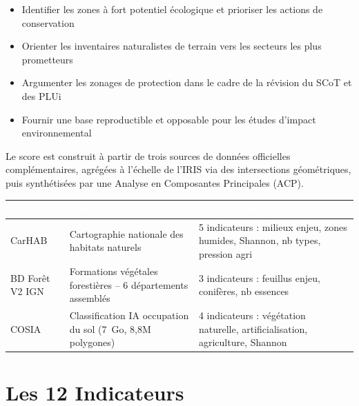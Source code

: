 \documentclass[12pt,a4paper]{report}
\begin{document}
\begin{itemize}[leftmargin=1.5cm]
  \item Identifier les zones à fort potentiel écologique et prioriser les actions de conservation
  \item Orienter les inventaires naturalistes de terrain vers les secteurs les plus prometteurs
  \item Argumenter les zonages de protection dans le cadre de la révision du SCoT et des PLUi
  \item Fournir une base reproductible et opposable pour les études d'impact environnemental
\end{itemize}

\vspace{0.4cm}
Le score est construit à partir de trois sources de données officielles complémentaires, agrégées à l'échelle de l'IRIS via des intersections géométriques, puis synthétisées par une Analyse en Composantes Principales (ACP).

\vspace{0.6cm}
\begin{tabularx}{\textwidth}{L{2.5cm} L{3.5cm} X}
  \toprule
  \textcolor{white}{\textbf{Source}} &
  \textcolor{white}{\textbf{Description}} &
  \textcolor{white}{\textbf{Variables extraites}} \\
  \midrule
  CarHAB & Cartographie nationale des habitats naturels &
    5 indicateurs : milieux enjeu, zones humides, Shannon, nb types, pression agri \\
  BD Forêt V2 IGN & Formations végétales forestières -- 6 départements assemblés &
    3 indicateurs : feuillus enjeu, conifères, nb essences \\
  COSIA & Classification IA occupation du sol (7~Go, 8,8M polygones) &
    4 indicateurs : végétation naturelle, artificialisation, agriculture, Shannon \\
  \bottomrule
\end{tabularx}

\section{Les 12 Indicateurs}
\end{document}
